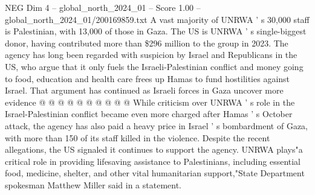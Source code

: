 \begin{textsample}{NEG Dim 4 – global\_north\_2024\_01 – Score 1.00 – global\_north\_2024\_01/200169859.txt}
A vast majority of UNRWA ' s 30,000 staff is Palestinian, with 13,000 of those in Gaza.
The US is UNRWA ' s single-biggest donor, having contributed more than \$296 million to the group in 2023.
The agency has long been regarded with suspicion by Israel and Republicans in the US, who argue that it only fuels the Israeli-Palestinian conflict and money going to food, education and health care frees up Hamas to fund hostilities against Israel.
That argument has continued as Israeli forces in Gaza uncover more evidence @ @ @ @ @ @ @ @ @ @ While criticism over UNRWA ' s role in the Israel-Palestinian conflict became even more charged after Hamas ' s October attack, the agency has also paid a heavy price in Israel ' s bombardment of Gaza, with more than 150 of its staff killed in the violence.
Despite the recent allegations, the US signaled it continues to support the agency.
UNRWA plays"a critical role in providing lifesaving assistance to Palestinians, including essential food, medicine, shelter, and other vital humanitarian support,"State Department spokesman Matthew Miller said in a statement.

\end{textsample}

